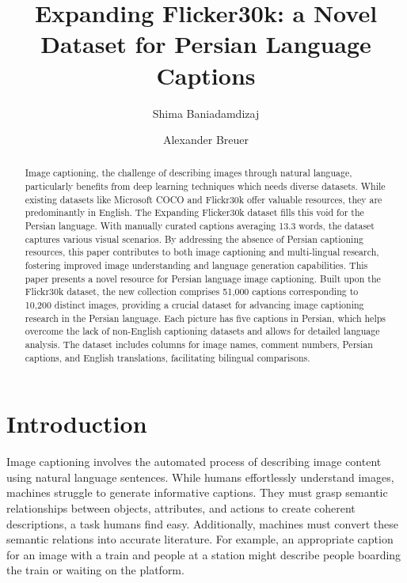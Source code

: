 \documentclass[runningheads]{llncs}
\begin{document}
%
\title{Expanding Flicker30k: a Novel Dataset for Persian Language Captions}
%
%
\author{Shima Baniadamdizaj \and
Alexander Breuer }
%
% 
%
\maketitle              %
%
\begin{abstract}
Image captioning, the challenge of describing images through natural language, particularly benefits from deep learning techniques which needs diverse datasets. While existing datasets like Microsoft COCO and Flickr30k offer valuable resources, they are predominantly in English. The Expanding Flicker30k dataset fills this void for the Persian language. With manually curated captions averaging 13.3 words, the dataset captures various visual scenarios. By addressing the absence of Persian captioning resources, this paper contributes to both image captioning and multi-lingual research, fostering improved image understanding and language generation capabilities.
This paper presents a novel resource for Persian language image captioning. Built upon the Flickr30k dataset, the new collection comprises 51,000 captions corresponding to 10,200 distinct images, providing a crucial dataset for advancing image captioning research in the Persian language. Each picture has five captions in Persian, which helps overcome the lack of non-English captioning datasets and allows for detailed language analysis. The dataset includes columns for image names, comment numbers, Persian captions, and English translations, facilitating bilingual comparisons.

\end{abstract}
%
%
%
\section{Introduction}
Image captioning involves the automated process of describing image content using natural language sentences. While humans effortlessly understand images, machines struggle to generate informative captions. They must grasp semantic relationships between objects, attributes, and actions to create coherent descriptions, a task humans find easy. Additionally, machines must convert these semantic relations into accurate literature. For example, an appropriate caption for an image with a train and people at a station might describe people boarding the train or waiting on the platform.
\end{document}
